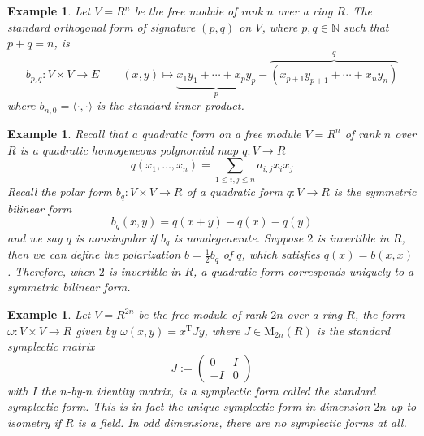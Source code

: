 \documentclass[10pt]{book}
\theoremstyle{bookplain}
\theoremstyle{bookdefinition}
\newtheorem{example}[theorem]{Example}
\theoremstyle{bookremark}
\begin{document}
\begin{example}Let $V=R^n$ be the free module of rank $n$ over a ring $R$. The \textit{standard orthogonal form} of signature $(p,q)$ on $V$, where $p,q\in\mathbb N$ such that $p+q=n$, is 
    \[b_{p,q}:V\times V\rightarrow E\qquad (x,y)\mapsto \underbrace{x_1y_1+\cdots+x_py_p}_p-\overbrace{(x_{p+1}y_{p+1}+\cdots+x_ny_n)}^q\]
    where $b_{n,0}=\langle\cdot,\cdot\rangle$ is the \textit{standard inner product}. 
\end{example}

\begin{example}Recall that a quadratic form on a free module $V=R^n$ of rank $n$ over $R$ is a quadratic homogeneous polynomial map $q:V\rightarrow R$ 
    \[q(x_1,\dots,x_n)=\sum_{1\le i,j\le n}a_{i,j}x_ix_j\]
    Recall the polar form $b_q:V\times V\rightarrow R$ of a quadratic form $q:V\rightarrow R$ is the symmetric bilinear form 
    \[b_q(x,y)=q(x+y)-q(x)-q(y)\]
    and we say $q$ is nonsingular if $b_q$ is nondegenerate. Suppose $2$ is invertible in $R$, then we can define the polarization $b=\frac{1}{2}b_q$ of $q$, which satisfies $q(x)=b(x,x)$. 
    Therefore, when $2$ is invertible in $R$, a quadratic form corresponds uniquely to a symmetric bilinear form. 
\end{example}
\begin{example}Let $V=R^{2n}$ be the free module of rank $2n$ over a ring $R$, the form $\omega:V\times V\rightarrow R$ given by $\omega(x,y)=x^{\mathrm T}Jy$, where $J\in \mathrm M_{2n}(R)$ is the \textit{standard symplectic matrix} 
    \[J:=\begin{pmatrix}0&I\\ -I& 0\end{pmatrix}\]
    with $I$ the $n$-by-$n$ identity matrix, is a symplectic form called the \textit{standard symplectic form}. This is in fact the unique symplectic form in dimension $2n$ up to isometry if $R$ is a field. In odd dimensions, there are no symplectic forms at all. 
\end{example}
\end{document}
